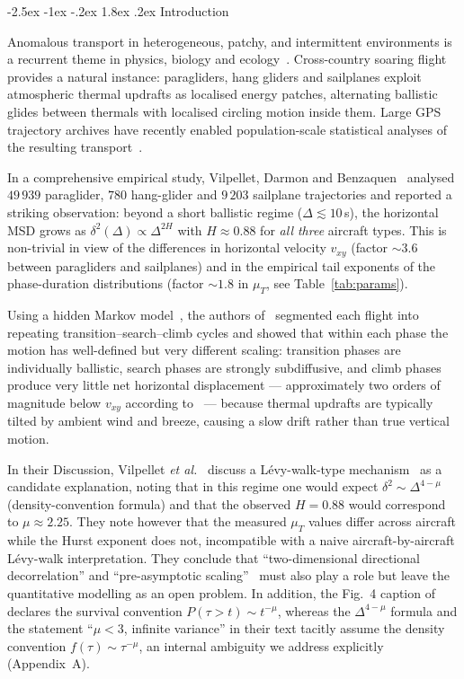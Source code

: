 \documentclass[11pt,a4paper]{article}
\makeatletter
\renewcommand\section{\@startsection{section}{1}{\z@}%
  {-2.5ex \@plus -1ex \@minus -.2ex}%
  {1.8ex \@plus.2ex}%
  {\normalfont\normalsize\bfseries\centering}}
\makeatother
\begin{document}
\section{Introduction}

Anomalous transport in heterogeneous, patchy, and intermittent
environments is a recurrent theme in physics, biology and
ecology~\cite{metzler2000,zaburdaev2015,codling2008,benichou2011}.
Cross-country soaring flight provides a natural instance: paragliders,
hang gliders and sailplanes exploit atmospheric thermal updrafts as
localised energy patches, alternating ballistic glides between
thermals with localised circling motion inside them. Large GPS
trajectory archives have recently enabled population-scale
statistical analyses of the resulting transport~\cite{vilpellet2026}.

In a comprehensive empirical study, Vilpellet, Darmon and
Benzaquen~\cite{vilpellet2026} analysed $49\,939$ paraglider, $780$
hang-glider and $9\,203$ sailplane trajectories and reported a
striking observation: beyond a short ballistic regime
($\Delta \lesssim 10$\,s), the horizontal MSD grows as
$\delta^2(\Delta) \propto \Delta^{2H}$ with $H \approx 0.88$ for
\emph{all three} aircraft types. This is non-trivial in view of the
differences in horizontal velocity $v_{xy}$ (factor $\sim 3.6$
between paragliders and sailplanes) and in the empirical tail
exponents of the phase-duration distributions (factor $\sim 1.8$ in
$\mu_T$, see Table~\ref{tab:params}).

Using a hidden Markov model~\cite{rabiner1989}, the authors
of~\cite{vilpellet2026} segmented each flight into repeating
transition--search--climb cycles and showed that within each phase
the motion has well-defined but very different scaling: transition
phases are individually ballistic, search phases are strongly
subdiffusive, and climb phases produce very little net horizontal
displacement --- approximately two orders of magnitude below $v_{xy}$
according to~\cite{vilpellet2026} --- because thermal updrafts are
typically tilted by ambient wind and breeze, causing a slow drift
rather than true vertical motion.

In their Discussion, Vilpellet \emph{et al.}~\cite{vilpellet2026}
discuss a L\'evy-walk-type mechanism~\cite{zaburdaev2015} as a
candidate explanation, noting that in this regime one would expect
$\delta^2 \sim \Delta^{4-\mu}$ (density-convention formula) and that
the observed $H = 0.88$ would correspond to $\mu \approx 2.25$. They
note however that the measured $\mu_T$ values differ across aircraft
while the Hurst exponent does not, incompatible with a naive
aircraft-by-aircraft L\'evy-walk interpretation. They conclude that
``two-dimensional directional decorrelation'' and
``pre-asymptotic scaling''~\cite{metzler2000,meroz2015} must also
play a role but leave the quantitative modelling as an open problem.
In addition, the Fig.~4 caption of~\cite{vilpellet2026} declares the
survival convention $P(\tau>t)\sim t^{-\mu}$, whereas the
$\Delta^{4-\mu}$ formula and the statement ``$\mu<3$, infinite
variance'' in their text tacitly assume the density convention
$f(\tau)\sim\tau^{-\mu}$, an internal ambiguity we address
explicitly (Appendix~A).
\end{document}

